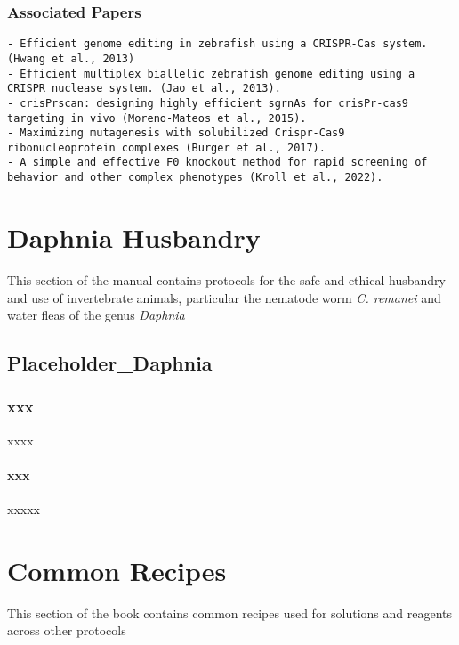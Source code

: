 \documentclass[
  letterpaper,
  DIV=11,
  numbers=noendperiod]{scrreprt}
\begin{document}
\hypertarget{associated-papers-60}{%
\section{Associated Papers}\label{associated-papers-60}}

\begin{verbatim}
- Efficient genome editing in zebrafish using a CRISPR-Cas system. (Hwang et al., 2013)
- Efficient multiplex biallelic zebrafish genome editing using a CRISPR nuclease system. (Jao et al., 2013). 
- crisPrscan: designing highly efficient sgrnAs for crisPr-cas9 targeting in vivo (Moreno-Mateos et al., 2015). 
- Maximizing mutagenesis with solubilized Crispr-Cas9 ribonucleoprotein complexes (Burger et al., 2017). 
- A simple and effective F0 knockout method for rapid screening of behavior and other complex phenotypes (Kroll et al., 2022). 
\end{verbatim}

\part{Daphnia Husbandry}

This section of the manual contains protocols for the safe and ethical
husbandry and use of invertebrate animals, particular the nematode worm
\emph{C. remanei} and water fleas of the genus \emph{Daphnia}

\hypertarget{sec-Daphnia}{%
\chapter{Placeholder\_Daphnia}\label{sec-Daphnia}}

\hypertarget{xxx-2}{%
\section{xxx}\label{xxx-2}}

xxxx

\hypertarget{xxx-3}{%
\subsection{xxx}\label{xxx-3}}

xxxxx

\part{Common Recipes}

This section of the book contains common recipes used for solutions and
reagents across other protocols
\end{document}

